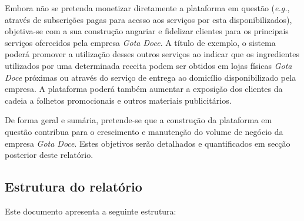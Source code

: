 Embora não se pretenda monetizar diretamente a plataforma em questão (\emph{e.g.}, através de subscrições pagas para acesso aos serviços por esta disponibilizados), objetiva-se com a sua construção angariar e fidelizar clientes para os principais serviços oferecidos pela empresa \emph{Gota Doce}. A título de exemplo, o sistema poderá promover a utilização desses outros serviços ao indicar que os ingredientes utilizados por uma determinada receita podem ser obtidos em lojas físicas \emph{Gota Doce} próximas ou através do serviço de entrega ao domicílio disponibilizado pela empresa. A plataforma poderá também aumentar a exposição dos clientes da cadeia a folhetos promocionais e outros materiais publicitários.

De forma geral e sumária, pretende-se que a construção da plataforma em questão contribua para o crescimento e manutenção do volume de negócio da empresa \emph{Gota Doce}. Estes objetivos serão detalhados e quantificados em secção posterior deste relatório.



\subsection{Estrutura do relatório}
\label{sec:introducao:estrutura-relatorio}

Este documento apresenta a seguinte estrutura:

